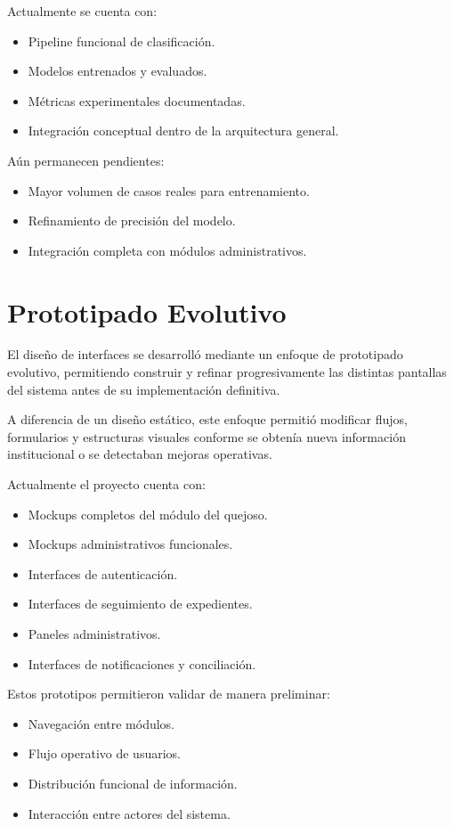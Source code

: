 Actualmente se cuenta con:

\begin{itemize}
    \item Pipeline funcional de clasificación.
    \item Modelos entrenados y evaluados.
    \item Métricas experimentales documentadas.
    \item Integración conceptual dentro de la arquitectura general.
\end{itemize}

Aún permanecen pendientes:

\begin{itemize}
    \item Mayor volumen de casos reales para entrenamiento.
    \item Refinamiento de precisión del modelo.
    \item Integración completa con módulos administrativos.
\end{itemize}

\section{Prototipado Evolutivo}

El diseño de interfaces se desarrolló mediante un enfoque de prototipado evolutivo, permitiendo construir y refinar progresivamente las distintas pantallas del sistema antes de su implementación definitiva.

A diferencia de un diseño estático, este enfoque permitió modificar flujos, formularios y estructuras visuales conforme se obtenía nueva información institucional o se detectaban mejoras operativas.

Actualmente el proyecto cuenta con:

\begin{itemize}
    \item Mockups completos del módulo del quejoso.
    \item Mockups administrativos funcionales.
    \item Interfaces de autenticación.
    \item Interfaces de seguimiento de expedientes.
    \item Paneles administrativos.
    \item Interfaces de notificaciones y conciliación.
\end{itemize}

Estos prototipos permitieron validar de manera preliminar:

\begin{itemize}
    \item Navegación entre módulos.
    \item Flujo operativo de usuarios.
    \item Distribución funcional de información.
    \item Interacción entre actores del sistema.
\end{itemize}